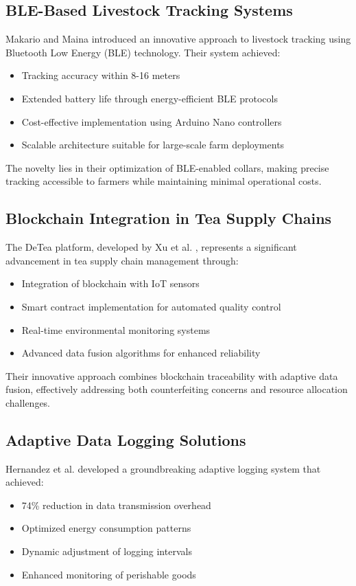 \documentclass[conference]{IEEEtran}
\begin{document}
\subsection{BLE-Based Livestock Tracking Systems}
Makario and Maina \cite{makario2021bluetooth} introduced an innovative approach to livestock tracking using Bluetooth Low Energy (BLE) technology. Their system achieved:
\begin{itemize}
    \item Tracking accuracy within 8-16 meters
    \item Extended battery life through energy-efficient BLE protocols
    \item Cost-effective implementation using Arduino Nano controllers
    \item Scalable architecture suitable for large-scale farm deployments
\end{itemize}

The novelty lies in their optimization of BLE-enabled collars, making precise tracking accessible to farmers while maintaining minimal operational costs.

\subsection{Blockchain Integration in Tea Supply Chains}
The DeTea platform, developed by Xu et al. \cite{xu2023novel}, represents a significant advancement in tea supply chain management through:
\begin{itemize}
    \item Integration of blockchain with IoT sensors
    \item Smart contract implementation for automated quality control
    \item Real-time environmental monitoring systems
    \item Advanced data fusion algorithms for enhanced reliability
\end{itemize}

Their innovative approach combines blockchain traceability with adaptive data fusion, effectively addressing both counterfeiting concerns and resource allocation challenges.

\subsection{Adaptive Data Logging Solutions}
Hernandez et al. \cite{hernandez2024implementation} developed a groundbreaking adaptive logging system that achieved:
\begin{itemize}
    \item 74\% reduction in data transmission overhead
    \item Optimized energy consumption patterns
    \item Dynamic adjustment of logging intervals
    \item Enhanced monitoring of perishable goods
\end{itemize}
\end{document}
